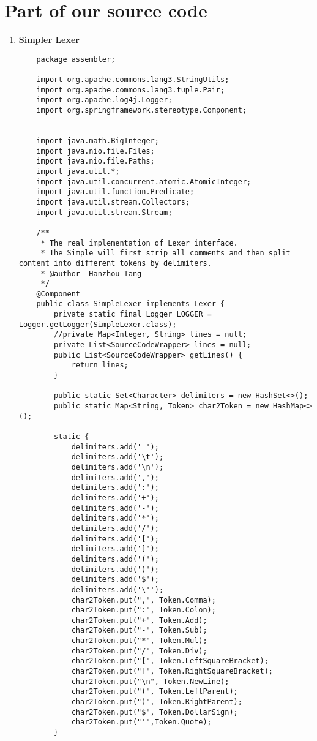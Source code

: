 \documentclass[12pt]{extarticle}
\begin{document}
\section{Part of our source code}
\begin{enumerate}

    \item\textbf {Simpler Lexer} \\
    \begin{lstlisting}
    package assembler;
    
    import org.apache.commons.lang3.StringUtils;
    import org.apache.commons.lang3.tuple.Pair;
    import org.apache.log4j.Logger;
    import org.springframework.stereotype.Component;
    
    
    import java.math.BigInteger;
    import java.nio.file.Files;
    import java.nio.file.Paths;
    import java.util.*;
    import java.util.concurrent.atomic.AtomicInteger;
    import java.util.function.Predicate;
    import java.util.stream.Collectors;
    import java.util.stream.Stream;
    
    /**
     * The real implementation of Lexer interface.
     * The Simple will first strip all comments and then split content into different tokens by delimiters.
     * @author  Hanzhou Tang
     */
    @Component
    public class SimpleLexer implements Lexer {
        private static final Logger LOGGER = Logger.getLogger(SimpleLexer.class);
        //private Map<Integer, String> lines = null;
        private List<SourceCodeWrapper> lines = null;
        public List<SourceCodeWrapper> getLines() {
            return lines;
        }
    
        public static Set<Character> delimiters = new HashSet<>();
        public static Map<String, Token> char2Token = new HashMap<>();
    
        static {
            delimiters.add(' ');
            delimiters.add('\t');
            delimiters.add('\n');
            delimiters.add(',');
            delimiters.add(':');
            delimiters.add('+');
            delimiters.add('-');
            delimiters.add('*');
            delimiters.add('/');
            delimiters.add('[');
            delimiters.add(']');
            delimiters.add('(');
            delimiters.add(')');
            delimiters.add('$');
            delimiters.add('\'');
            char2Token.put(",", Token.Comma);
            char2Token.put(":", Token.Colon);
            char2Token.put("+", Token.Add);
            char2Token.put("-", Token.Sub);
            char2Token.put("*", Token.Mul);
            char2Token.put("/", Token.Div);
            char2Token.put("[", Token.LeftSquareBracket);
            char2Token.put("]", Token.RightSquareBracket);
            char2Token.put("\n", Token.NewLine);
            char2Token.put("(", Token.LeftParent);
            char2Token.put(")", Token.RightParent);
            char2Token.put("$", Token.DollarSign);
            char2Token.put("'",Token.Quote);
        }
    

\end{lstlisting}
\end{enumerate}
\end{document}
